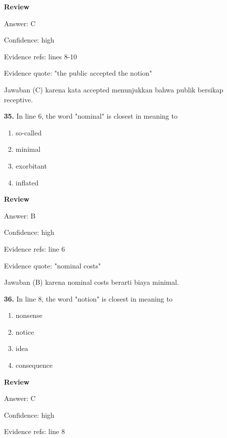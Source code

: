\documentclass[12pt]{article}
\begin{document}
\par
\begingroup
\setlength{\parskip}{0pt}
\setlength{\parindent}{0pt}
\textbf{Review}\par
Answer: C\par
Confidence: high\par
Evidence refs: lines 8-10\par
Evidence quote: "the public accepted the notion"\par
Jawaban (C) karena kata accepted menunjukkan bahwa publik bersikap receptive.\par
\endgroup
\par
\vspace{0.25\baselineskip}
\noindent\textbf{35.} In line 6, the word "nominal" is closest in meaning to
\begin{enumerate}[label=(\Alph*),leftmargin=*,itemsep=0.2em]
\item so-called
\item minimal
\item exorbitant
\item inflated
\end{enumerate}
\par
\begingroup
\setlength{\parskip}{0pt}
\setlength{\parindent}{0pt}
\textbf{Review}\par
Answer: B\par
Confidence: high\par
Evidence refs: line 6\par
Evidence quote: "nominal costs"\par
Jawaban (B) karena nominal costs berarti biaya minimal.\par
\endgroup
\par
\vspace{0.25\baselineskip}
\noindent\textbf{36.} In line 8, the word "notion" is closest in meaning to
\begin{enumerate}[label=(\Alph*),leftmargin=*,itemsep=0.2em]
\item nonsense
\item notice
\item idea
\item consequence
\end{enumerate}
\par
\begingroup
\setlength{\parskip}{0pt}
\setlength{\parindent}{0pt}
\textbf{Review}\par
Answer: C\par
Confidence: high\par
Evidence refs: line 8\par
\end{document}
